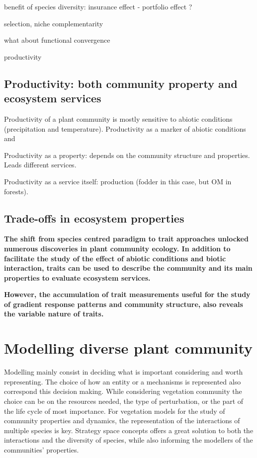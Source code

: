 benefit of species diversity: insurance effect - portfolio effect ?

selection, niche complementarity

what about functional convergence

productivity 

\textbf{}

\subsection{Productivity: both community property and ecosystem services}

Productivity of a plant community is mostly sensitive to abiotic conditions (precipitation and temperature). 
Productivity as a marker of abiotic conditions and 

Productivity as a property: depends on the community structure and properties. Leads different services.

Productivity as a service itself: production (fodder in this case, but OM in forests).

\textbf{}

\subsection{Trade-offs in ecosystem properties}


\textbf{}


\textbf{The shift from species centred paradigm to trait approaches unlocked numerous discoveries in plant community ecology. In addition to facilitate the study of the effect of abiotic conditions and biotic interaction, traits can be used to describe the community and its main properties to evaluate ecosystem services.}

\textbf{However, the accumulation of trait measurements useful for the study of gradient response patterns and community structure, also reveals the variable nature of traits.}



\section{Modelling diverse plant community}

Modelling mainly consist in deciding what is important considering and worth representing. The choice of how an entity or a mechanisms is represented also correspond this decision making. While considering vegetation community the choice can be on the resources needed, the type of perturbation, or the part of the life cycle of most importance. For vegetation models for the study of community properties and dynamics, the representation of the interactions of multiple species is key. Strategy space concepts offers a great solution to both the interactions and the diversity of species, while also informing the modellers of the communities' properties.

